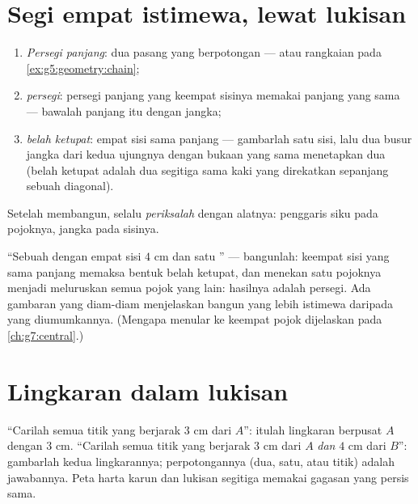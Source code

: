 \section{Segi empat istimewa, lewat lukisan}

\begin{method}\label{met:g5:geometry:quadrilaterals}
\begin{enumerate}
  \item \emph{Persegi panjang}: dua pasang  yang
        berpotongan  --- atau rangkaian pada
        \cref{ex:g5:geometry:chain};
  \item \emph{persegi}: persegi panjang yang keempat sisinya memakai
        panjang yang sama --- bawalah panjang itu dengan jangka;
  \item \emph{belah ketupat}: empat sisi sama panjang --- gambarlah
        satu sisi, lalu dua busur jangka dari kedua ujungnya dengan
        bukaan yang sama menetapkan dua   (belah
        ketupat adalah dua segitiga sama kaki yang direkatkan
        sepanjang sebuah diagonal).
\end{enumerate}
Setelah membangun, selalu \emph{periksalah} dengan alatnya:
penggaris siku pada pojoknya, jangka pada sisinya.
\end{method}

\begin{example}\label{ex:g5:geometry:recognize}
``Sebuah  dengan empat sisi $4$ cm dan satu '' --- bangunlah: keempat sisi yang sama panjang memaksa
bentuk belah ketupat, dan menekan satu pojoknya menjadi  meluruskan semua pojok yang lain: hasilnya adalah persegi.
Ada gambaran yang diam-diam menjelaskan bangun yang lebih istimewa
daripada yang diumumkannya. (Mengapa  menular ke
keempat pojok dijelaskan pada \cref{ch:g7:central}.)
\end{example}

\section{Lingkaran dalam lukisan}

\begin{example}\label{ex:g5:geometry:circle}
``Carilah semua titik yang berjarak $3$ cm dari $A$'': itulah
lingkaran berpusat $A$ dengan  $3$ cm. ``Carilah semua
titik yang berjarak $3$ cm dari $A$ \emph{dan} $4$ cm dari $B$'':
gambarlah kedua lingkarannya; perpotongannya (dua, satu, atau 
titik) adalah jawabannya. Peta harta karun dan lukisan segitiga
memakai gagasan yang persis sama.
\end{example}

